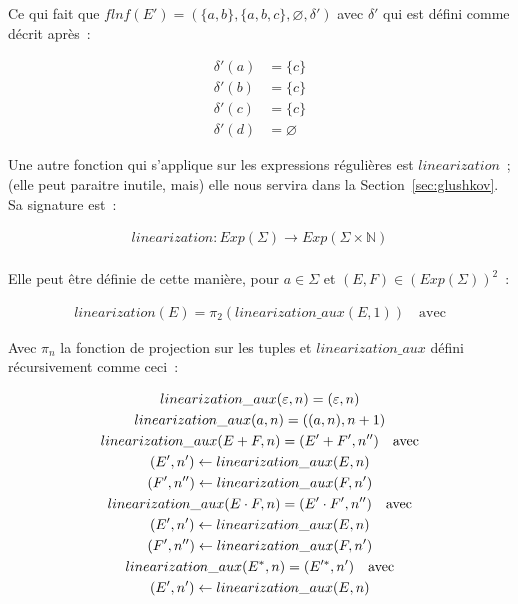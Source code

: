 \begin{example}
    Ce qui fait que \(flnf(E') = (\{a, b\}, \{a, b, c\}, \varnothing, \delta')\)
    avec \(\delta'\) qui est défini comme décrit après~:

    \begin{align*}
        \delta'(a) & = \{c\}       \\
        \delta'(b) & = \{c\}       \\
        \delta'(c) & = \{c\}       \\
        \delta'(d) & = \varnothing
    \end{align*}

\end{example}

\vphantom{}

Une autre fonction qui s'applique sur les expressions régulières est
\(linearization\)~; (elle peut paraitre inutile, mais) elle nous servira dans
la Section~\ref{sec:glushkov}. Sa signature est~:

\begin{gather*}
    linearization: Exp(\Sigma) \to Exp(\Sigma \times \mathbb{N}) \\
\end{gather*}

Elle peut être définie de cette manière, pour \(a \in \Sigma\) et \((E, F) \in
(Exp(\Sigma))^2\)~:

\begin{gather*}
    linearization(E) = \pi_2(linearization\_aux(E, 1)) \quad \text{avec}
\end{gather*}

\noindent Avec \(\pi_n\) la fonction de projection sur les tuples et
\(linearization\_aux\) défini récursivement comme ceci~:

\begin{gather*}
    linearization\_aux(\varepsilon, n) = (\varepsilon, n) \\
    linearization\_aux(a, n) = ((a, n), n + 1) \\
    linearization\_aux(E + F, n) = (E' + F', n'') \quad \text{avec} \\
    (E', n') \leftarrow linearization\_aux(E, n) \notag \\
    (F', n'') \leftarrow linearization\_aux(F, n') \notag \\
    linearization\_aux(E \cdot F, n) = (E' \cdot F', n'') \quad \text{avec} \\
    (E', n') \leftarrow linearization\_aux(E, n) \notag \\
    (F', n'') \leftarrow linearization\_aux(F, n') \notag \\
    linearization\_aux(E^*, n) = (E'^*, n') \quad \text{avec} \\
    (E', n') \leftarrow linearization\_aux(E, n) \notag
\end{gather*}

